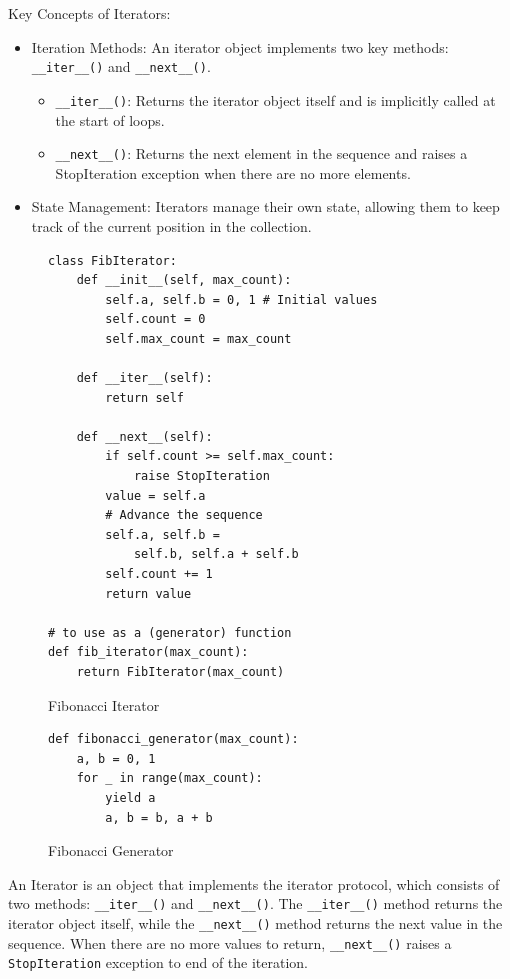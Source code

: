 \documentclass[oneside,11pt,dvipsnames]{book}
\newcommand{\code}[1]{\texttt{#1}}
\begin{document}
Key Concepts of Iterators:
\begin{itemize}
\item Iteration Methods: An iterator object implements two key methods: \code{\_\_iter\_\_()} and \code{\_\_next\_\_()}.
\begin{itemize}
    \item \code{\_\_iter\_\_()}: Returns the iterator object itself and is implicitly called at the start of loops.
	\item \code{\_\_next\_\_()}: Returns the next element in the sequence and raises a StopIteration exception when there are no more elements.
\end{itemize}
\item State Management: Iterators manage their own state, allowing them to keep track of the current position in the collection.
\end{itemize}

\begin{figure}
    \begin{minipage}[T]{0.50\textwidth}
\begin{lstlisting}
class FibIterator:
    def __init__(self, max_count):
        self.a, self.b = 0, 1 # Initial values
        self.count = 0
        self.max_count = max_count

    def __iter__(self):
        return self

    def __next__(self):
        if self.count >= self.max_count:
            raise StopIteration
        value = self.a
        # Advance the sequence
        self.a, self.b = 
            self.b, self.a + self.b  
        self.count += 1
        return value

# to use as a (generator) function        
def fib_iterator(max_count):
    return FibIterator(max_count)

\end{lstlisting}
\caption{Fibonacci Iterator}\label{fig:fib-iterator}
\end{minipage}
\begin{minipage}{0.50\textwidth}
    \begin{lstlisting}
def fibonacci_generator(max_count):
    a, b = 0, 1
    for _ in range(max_count):
        yield a
        a, b = b, a + b        
    \end{lstlisting}
    \caption{Fibonacci Generator}\label{fig:fib-generator}
\end{minipage}    
\end{figure}

An Iterator is an object that implements the iterator protocol, which consists of two methods: \code{\_\_iter\_\_()} and \code{\_\_next\_\_()}. The \code{\_\_iter\_\_()} method returns the iterator object itself, while the \code{\_\_next\_\_()} method returns the next value in the sequence. When there are no more values to return, \code{\_\_next\_\_()} raises a \code{StopIteration} exception to end of the iteration.
\end{document}
